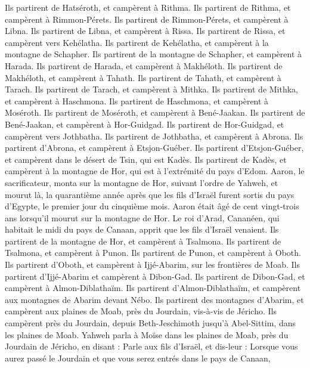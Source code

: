 \begin{multicols}{2}
Ils partirent de Hatséroth, et campèrent à Rithma.
Ils partirent de Rithma, et campèrent à Rimmon-Pérets.
Ils partirent de Rimmon-Pérets, et campèrent à Libna.
Ils partirent de Libna, et campèrent à Rissa.
Ils partirent de Rissa, et campèrent vers Kehélatha.
Ils partirent de Kehélatha, et campèrent à la montagne de Schapher.
Ils partirent de la montagne de Schapher, et campèrent à Harada.
Ils partirent de Harada, et campèrent à Makhéloth.
Ils partirent de Makhéloth, et campèrent à Tahath.
Ils partirent de Tahath, et campèrent à Tarach.
Ils partirent de Tarach, et campèrent à Mithka.
Ils partirent de Mithka, et campèrent à Haschmona.
Ils partirent de Haschmona, et campèrent à Moséroth.
Ils partirent de Moséroth, et campèrent à Bené-Jaakan.
Ils partirent de Bené-Jaakan, et campèrent à Hor-Guidgad.
Ils partirent de Hor-Guidgad, et campèrent vers Jothbatha.
Ils partirent de Jothbatha, et campèrent à Abrona.
Ils partirent d’Abrona, et campèrent à Etsjon-Guéber.
Ils partirent d’Etsjon-Guéber, et campèrent dans le désert de Tsin, qui est Kadès.
Ils partirent de Kadès, et campèrent à la montagne de Hor, qui est à l’extrémité du pays d'Edom.
Aaron, le sacrificateur, monta sur la montagne de Hor, suivant l’ordre de Yahweh, et mourut là, la quarantième année après que les fils d'Israël furent sortis du pays d'Egypte, le premier jour du cinquième mois.
Aaron était âgé de cent vingt-trois ans lorsqu’il mourut sur la montagne de Hor.
Le roi d’Arad, Cananéen, qui habitait le midi du pays de Canaan, apprit que les fils d'Israël venaient.
Ils partirent de la montagne de Hor, et campèrent à Tsalmona.
Ils partirent de Tsalmona, et campèrent à Punon.
Ils partirent de Punon, et campèrent à Oboth.
Ils partirent d'Oboth, et campèrent à Ijjé-Abarim, sur les frontières de Moab.
Ils partirent d’Ijjé-Abarim et campèrent à Dibon-Gad.
Ils partirent de Dibon-Gad, et campèrent à Almon-Diblathaïm.
Ils partirent d’Almon-Diblathaïm, et campèrent aux montagnes de Abarim devant Nébo.
Ils partirent des montagnes d’Abarim, et campèrent aux plaines de Moab, près du Jourdain, vis-à-vis de Jéricho.
Ils campèrent près du Jourdain, depuis Beth-Jeschimoth jusqu'à Abel-Sittim, dans les plaines de Moab.
Yahweh parla à Moïse dans les plaines de Moab, près du Jourdain de Jéricho, en disant :
Parle aux fils d’Israël, et dis-leur : Lorsque vous aurez passé le Jourdain et que vous serez entrés dans le pays de Canaan,

\end{multicols}
